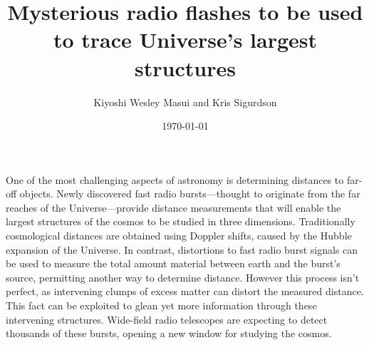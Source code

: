 \documentclass{article}
\title{Mysterious radio flashes to be used to trace Universe's largest
structures}
\date{\today}
\author{Kiyoshi Wesley Masui and Kris Sigurdson}
\begin{document}
\maketitle

One of the most challenging aspects of astronomy is determining distances to
far-off objects. Newly discovered fast radio bursts---thought to originate from
the far reaches of the Universe---provide distance measurements that will
enable the largest structures of the cosmos to be studied in three dimensions.
Traditionally cosmological distances are obtained using Doppler shifts, caused
by the Hubble expansion of the Universe. In contrast, distortions to fast radio
burst signals can be used to measure the total amount material between earth
and the burst's source, permitting another way to determine distance.  However
this process isn't perfect, as intervening clumps of excess matter can distort the
measured distance. This fact can be exploited to glean yet more
information through these intervening structures.  Wide-field radio telescopes
are expecting to detect thousands of these bursts, opening a new window for
studying the cosmos.
\end{document}
